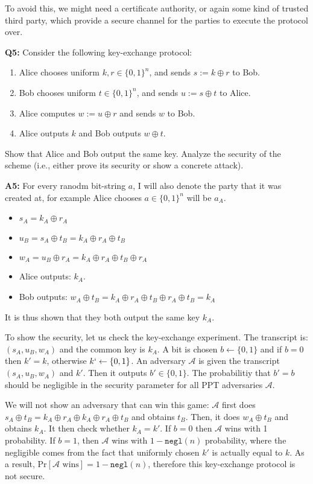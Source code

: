 \documentclass[12pt,reqno]{amsart}
\newcommand{\code}[1]{\texttt{#1}}
\newcommand{\pr}[0]{\text{Pr}}
\newcommand{\wins}[0]{\text{ wins}}
\newcommand{\advrs}[0]{\mathcal{A}}
\begin{document}
To avoid this, we might need a certificate authority, or again some kind of trusted third party, which provide a secure channel for the parties to execute the protocol over.

\vspace{20px}
\textbf{Q5:} Consider the following key-exchange protocol:
\begin{enumerate}[label=\alph*.]
\item Alice chooses uniform $k, r \in \{0,1\}^n$, and sends $s := k \oplus r$ to Bob.
\item Bob chooses uniform $t \in \{0,1\}^n$, and sends $u := s \oplus t$ to Alice.
\item Alice computes $w := u \oplus r$ and sends $w$ to Bob.
\item Alice outputs $k$ and Bob outputs $w \oplus t$.
\end{enumerate}
Show that Alice and Bob output the same key. Analyze the security of the scheme (i.e., either prove its security or show a concrete attack).

\textbf{A5:}  For every ranodm bit-string $a$, I will also denote the party that it was created at, for example Alice chooses $a \in \{0, 1\}^n$ will be $a_A$.
\begin{itemize}
	\item $s_A = k_A \oplus r_A$
	\item $u_B = s_A \oplus t_B = k_A \oplus r_A \oplus t_B$
	\item $w_A = u_B \oplus r_A = k_A \oplus r_A \oplus t_B \oplus r_A$
	\item Alice outputs: $k_A$.
	\item Bob outputs: $w_A \oplus t_B = k_A \oplus r_A \oplus t_B \oplus r_A \oplus t_B = k_A$
\end{itemize}
It is thus shown that they both output the same key $k_A$.

To show the security, let us check the key-exchange experiment. The transcript is: $(s_A, u_B, w_A)$ and the common key is $k_A$. A bit is chosen $b \gets \{0, 1\}$ and if $b=0$ then $k' = k$, otherwise $k` \gets \{0, 1\}$. An adversary $\advrs$ is given the transcript $(s_A, u_B, w_A)$ and $k'$. Then it outputs $b' \in \{0, 1\}$. The probabilitiy that $b' = b$ should be negligible in the security parameter for all PPT adversaries $\advrs$. 

We will not show an adversary that can win this game: $\advrs$ first does $s_A \oplus t_B = k_A \oplus r_A \oplus k_A \oplus r_A \oplus t_B$ and obtains $t_B$. Then, it does $w_A \oplus t_B$ and obtains $k_A$. It then check whether $k_A = k'$. If $b=0$ then $\advrs$ wins with 1 probability. If $b=1$, then $\advrs$ wins with $1- \code{negl}(n)$ probability, where the negligible comes from the fact that uniformly chosen $k'$ is actually equal to $k$. As a result, $\pr[\advrs \wins] = 1 - \code{negl}(n)$, therefore this key-exchange protocol is not secure.
\end{document}
